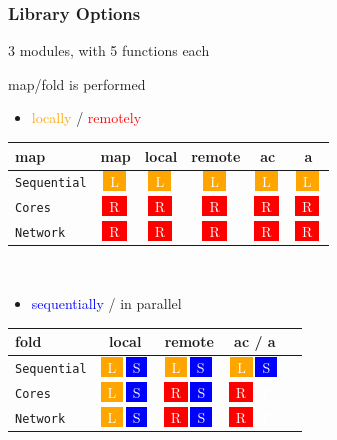 \documentclass{beamer}
\begin{document}
\begin{frame}\frametitle{Library Options}
  
  3 modules, with 5 functions each



  map/fold is performed 
  \begin{itemize}
  \item \textcolor{orange}{locally} / \textcolor{red}{remotely}
  \end{itemize}

    \newcommand{\Lo}{\colorbox{orange}{~\textcolor{white}{\small L}~}\,}
    \renewcommand{\Re}{\colorbox{red}{~\textcolor{white}{\small R}~}\,}
    \newcommand{\Se}{\colorbox{blue}{~\textcolor{white}{\small S}~}\,}
    \newcommand{\Pa}{\colorbox{kwblue}{~\textcolor{white}{\small P}~}\,}

  \begin{center}
    \begin{tabular}{|l|c|c|c|c|c|}
      \hline
        map    & map & local & remote & ac & a 
            \\\hline\hline
      \texttt{Sequential} & \Lo & \Lo & \Lo & \Lo & \Lo \\\hline
      \texttt{Cores}   & \Re & \Re & \Re & \Re & \Re \\\hline
      \texttt{Network}    & \Re & \Re & \Re & \Re & \Re \\\hline
    \end{tabular} \\[1em]
  \end{center}

  \begin{itemize}
    \item \textcolor{blue}{sequentially} / \textcolor{kwblue}{in parallel}
  \end{itemize}

  \begin{center}
    \begin{tabular}{|l|c|c|c|c|}
      \hline
        fold    & local & remote & ac / a 
            \\\hline\hline
      \texttt{Sequential} & \Lo\Se & \Lo\Se & \Lo\Se  
            \\\hline
      \texttt{Cores}   & \Lo\Se & \Re\Se & \Re\Pa  
            \\\hline
      \texttt{Network}    & \Lo\Se & \Re\Se & \Re\Pa  \\\hline
    \end{tabular}
  \end{center}
\end{frame}
\end{document}
